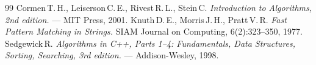 \begin{thebibliography}{99}
Cormen\,T.\,H., Leiserson\,C.\,E., Rivest\,R.\,L., Stein\,C.
{\itshape Introduction to Algorithms, 2nd edition.} --- MIT Press, 2001.
Knuth\,D.\,E., Morris\,J.\,H., Pratt\,V.\,R.
{\itshape Fast Pattern Matching in Strings.}
SIAM Journal on Computing, 6(2):323--350, 1977.
Sedgewick\,R.
{\itshape Algorithms in C++, Parts 1--4: Fundamentals, Data Structures, Sorting, Searching, 3rd edition.} --- Addison-Wesley, 1998.
\end{thebibliography}
\pagebreak
